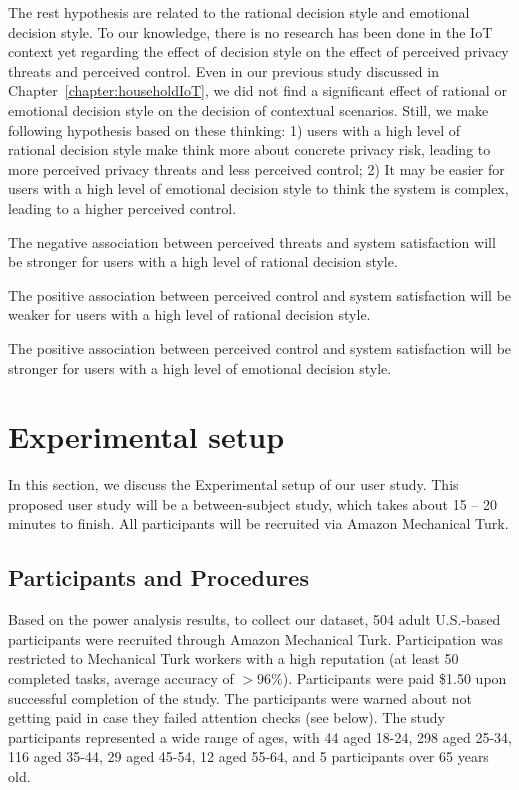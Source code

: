 The rest hypothesis are related to the rational decision style and emotional decision style. To our knowledge, there is no research has been done in the IoT context yet regarding the effect of decision style on the effect of perceived privacy threats and perceived control. Even in our previous study discussed in Chapter~\ref{chapter:householdIoT}, we did not find a significant effect of rational or emotional decision style on the decision of contextual scenarios. Still, we make following hypothesis based on these thinking: 1) users with a high level of rational decision style make think more about concrete privacy risk, leading to more perceived privacy threats and less perceived control; 2) It may be easier for users with a high level of emotional decision style to think the system is complex, leading to a higher perceived control.
\theoremgroup
\begin{theorem}
	The negative association between perceived threats and system satisfaction will be stronger for users with a high level of rational decision style.
\end{theorem}
\begin{theorem}
	The positive association between perceived control and system satisfaction will be weaker for users with a high level of rational decision style.
\end{theorem}
\begin{theorem}
	The positive association between perceived control and system satisfaction will be stronger for users with a high level of emotional decision style.
\end{theorem}

\section{Experimental setup}

In this section, we discuss the Experimental setup of our user study. This proposed user study will be a between-subject study, which takes about 15 -- 20 minutes to finish. All participants will be recruited via Amazon Mechanical Turk.

\subsection{Participants and Procedures}
Based on the power analysis results, to collect our dataset, 504 adult U.S.-based participants were recruited through Amazon Mechanical Turk. Participation was restricted to Mechanical Turk workers with a high reputation (at least 50 completed tasks, average accuracy of $> 96\%$). Participants were paid \$1.50 upon successful completion of the study. The participants were warned about not getting paid in case they failed attention checks (see below). The study participants represented a wide range of ages, with 44 aged 18-24, 298 aged 25-34, 116 aged 35-44, 29 aged 45-54, 12 aged 55-64, and 5 participants over 65 years old.

